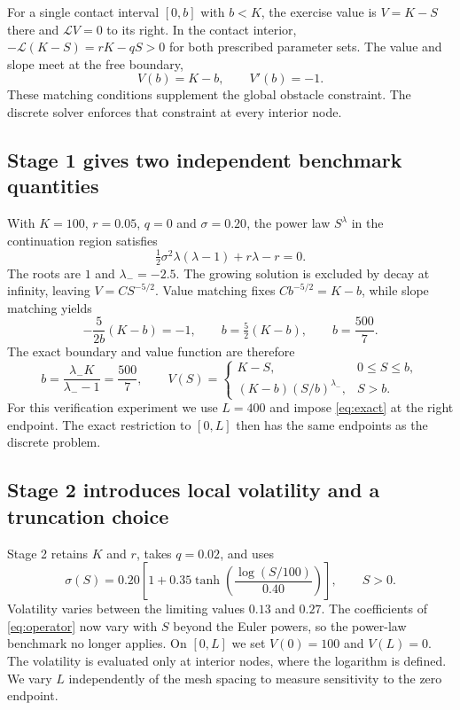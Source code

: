 \documentclass[11pt,a4paper]{article}
\numberwithin{equation}{section}
\begin{document}
For a single contact interval $[0,b]$ with $b<K$, the exercise value is
$V=K-S$ there and $\mathcal LV=0$ to its right. In the contact interior,
$-\mathcal L(K-S)=rK-qS>0$ for both prescribed parameter sets. The value
and slope meet at the free boundary,
\begin{equation}\label{eq:fit}
 V(b)=K-b,\qquad V'(b)=-1.
\end{equation}
These matching conditions supplement the global obstacle constraint.
The discrete solver enforces that constraint at every interior node.

\subsection{Stage 1 gives two independent benchmark quantities}
With $K=100$, $r=0.05$, $q=0$ and $\sigma=0.20$, the power law
$S^\lambda$ in the continuation region satisfies
\begin{equation}\label{eq:power}
  \tfrac12\sigma^2\lambda(\lambda-1)+r\lambda-r=0.
\end{equation}
The roots are $1$ and $\lambda_-=-2.5$. The growing solution is excluded by decay
at infinity, leaving $V=CS^{-5/2}$. Value matching fixes
$Cb^{-5/2}=K-b$, while slope matching yields
\begin{equation}\label{eq:boundary-derivation}
 -\frac{5}{2b}(K-b)=-1,
 \qquad b=\tfrac52(K-b),
 \qquad b=\frac{500}{7}.
\end{equation}
The exact boundary and value function are therefore
\begin{equation}\label{eq:exact}
 b=\frac{\lambda_-K}{\lambda_--1}=\frac{500}{7},
 \qquad
 V(S)=
 \begin{cases}
 K-S, & 0\le S\le b,\\
 (K-b)(S/b)^{\lambda_-}, & S>b.
 \end{cases}
\end{equation}
For this verification experiment we use $L=400$ and impose
\eqref{eq:exact} at the right endpoint. The exact restriction to $[0,L]$
then has the same endpoints as the discrete problem.

\subsection{Stage 2 introduces local volatility and a truncation choice}
Stage 2 retains $K$ and $r$, takes $q=0.02$, and uses
\begin{equation}\label{eq:volatility}
 \sigma(S)=0.20\left[1+0.35\tanh\left(\frac{\log(S/100)}{0.40}\right)\right],
 \qquad S>0.
\end{equation}
Volatility varies between the limiting values $0.13$ and $0.27$. The
coefficients of \eqref{eq:operator} now vary with $S$ beyond the Euler
powers, so the power-law benchmark no longer applies. On $[0,L]$ we set
$V(0)=100$ and $V(L)=0$. The volatility is evaluated only at interior
nodes, where the logarithm is defined. We vary $L$ independently of the
mesh spacing to measure sensitivity to the zero endpoint.
\end{document}
